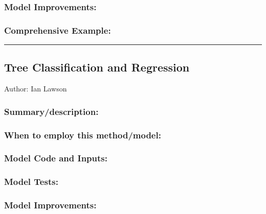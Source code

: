 \documentclass[
]{article}
\begin{document}
\hypertarget{model-improvements-9}{%
\subsubsection{Model Improvements:}\label{model-improvements-9}}

\hypertarget{comprehensive-example-9}{%
\subsubsection{Comprehensive Example:}\label{comprehensive-example-9}}

\begin{center}\rule{0.5\linewidth}{0.5pt}\end{center}

\hypertarget{tree-classification-and-regression}{%
\subsection{Tree Classification and
Regression}\label{tree-classification-and-regression}}

Author: Ian Lawson

\hypertarget{summarydescription-10}{%
\subsubsection{Summary/description:}\label{summarydescription-10}}

\hypertarget{when-to-employ-this-methodmodel-10}{%
\subsubsection{When to employ this
method/model:}\label{when-to-employ-this-methodmodel-10}}

\hypertarget{model-code-and-inputs-10}{%
\subsubsection{Model Code and Inputs:}\label{model-code-and-inputs-10}}

\hypertarget{model-tests-10}{%
\subsubsection{Model Tests:}\label{model-tests-10}}

\hypertarget{model-improvements-10}{%
\subsubsection{Model Improvements:}\label{model-improvements-10}}
\end{document}
